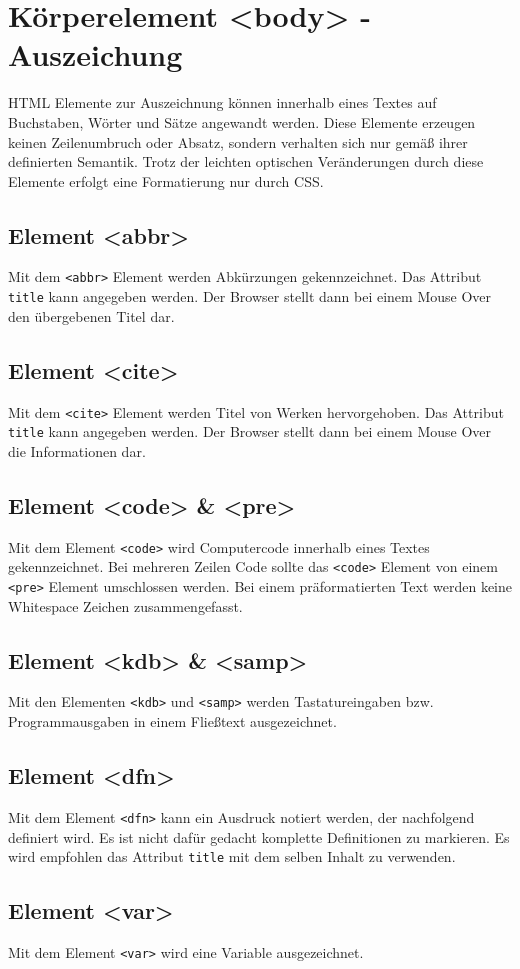 \chapter{Körperelement <body> - Auszeichung}
HTML Elemente zur Auszeichnung können innerhalb eines Textes auf Buchstaben, Wörter und Sätze angewandt werden. Diese Elemente erzeugen keinen Zeilenumbruch oder Absatz, sondern verhalten sich nur gemäß ihrer definierten Semantik. Trotz der leichten optischen Veränderungen durch diese Elemente erfolgt eine Formatierung nur durch CSS.
\section{Element <abbr>}
Mit dem \texttt{<abbr>} Element werden Abkürzungen gekennzeichnet. Das Attribut \texttt{title} kann angegeben werden. Der Browser stellt dann bei einem Mouse Over den übergebenen Titel dar.
\section{Element <cite>}
Mit dem \texttt{<cite>} Element werden Titel von Werken hervorgehoben. Das Attribut \texttt{title} kann angegeben werden. Der Browser stellt dann bei einem Mouse Over die Informationen dar.
\section{Element <code> \& <pre>}
Mit dem Element \texttt{<code>} wird Computercode innerhalb eines Textes gekennzeichnet. Bei mehreren Zeilen Code sollte das \texttt{<code>} Element von einem \texttt{<pre>} Element umschlossen werden. Bei einem präformatierten Text werden keine Whitespace Zeichen zusammengefasst.
\section{Element <kdb> \& <samp>}
Mit den Elementen \texttt{<kdb>} und \texttt{<samp>} werden Tastatureingaben bzw. Programmausgaben in einem Fließtext ausgezeichnet.
\section{Element <dfn>}
Mit dem Element \texttt{<dfn>} kann ein Ausdruck notiert werden, der nachfolgend definiert wird. Es ist nicht dafür gedacht komplette Definitionen zu markieren. Es wird empfohlen das Attribut \texttt{title} mit dem selben Inhalt zu verwenden.
\section{Element <var>}
Mit dem Element \texttt{<var>} wird eine Variable ausgezeichnet.
